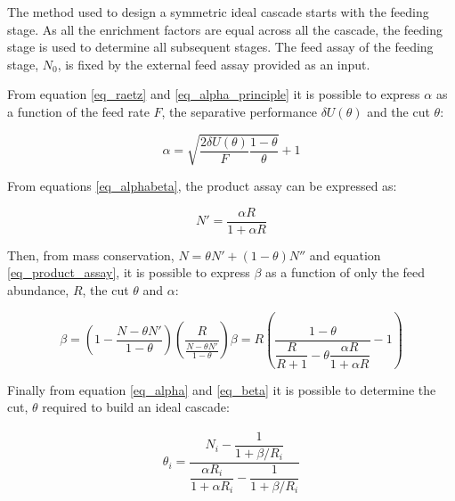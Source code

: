 The method used to design a symmetric ideal cascade starts with the feeding
stage. As all the enrichment factors are equal across all the cascade, the
feeding stage is used to determine all subsequent stages.
The feed assay of the feeding stage, $N_{0}$, is fixed by the external feed assay
provided as an input.

From equation \eqref{eq_raetz} and \eqref{eq_alpha_principle} it is possible to
express $\alpha$ as a function of the feed rate $F$, the separative performance
$\delta U(\theta)$ and the cut $\theta$:

\begin{equation} \label{eq_alpha}
    \alpha = \sqrt{\frac{2\delta U(\theta)}{F} \frac{1-\theta}{\theta}} + 1
\end{equation}


From equations \eqref{eq_alphabeta}, the product assay can be expressed as:

\begin{equation}\label{eq_product_assay}
    N' = \frac{\alpha R}{1 + \alpha R}
\end {equation}


Then, from mass conservation, $N = \theta N' + (1-\theta)N''$ and equation
\eqref{eq_product_assay}, it is possible to express $\beta$ as a function of
only the feed abundance, $R$, the cut $\theta$ and $\alpha$:

\begin{subequations}
    \begin{equation}\label{eq_beta_interim}
        \beta = \left( 1 - \frac{N - \theta N'}{1-\theta} \right)
                        \left( \frac{R}{\frac{N - \theta N'}{1 - \theta}} \right)
    \end{equation}
    \begin{equation}\label{eq_beta}
        \beta =   R \left(\dfrac{1-\theta}
                        {\dfrac{R}{R+1}- \theta \dfrac{\alpha R}{1+\alpha R}} -1\right)
    \end{equation}
\end{subequations}

Finally from equation \eqref{eq_alpha} and \eqref{eq_beta} it is possible to
determine the cut, $\theta$ required to build an ideal cascade:

\begin{eqnarray}
    \theta_{i} = \dfrac{N_{i} - \dfrac{1}{1 + \beta/R_{i}}}{ \dfrac{\alpha R_{i}}{1 + \alpha R_{i}} -
           \dfrac{1}{1 + \beta/R_{i}}}
           \label{eq_theta}
\end{eqnarray}


